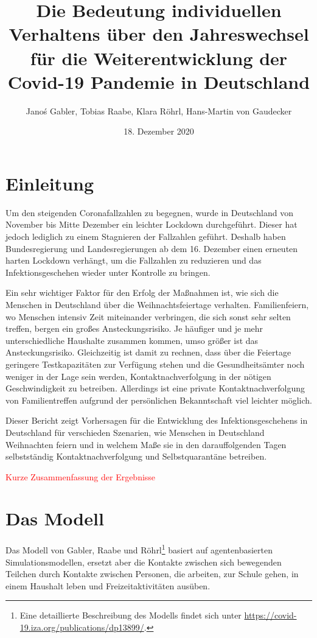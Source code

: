 \documentclass[a4paper,11pt,leqno,fleqn]{article}
\title{Die Bedeutung individuellen Verhaltens über den Jahreswechsel für die Weiterentwicklung der Covid-19 Pandemie in Deutschland}
\date{18. Dezember 2020}
\author{Janoś Gabler, Tobias Raabe, Klara Röhrl, Hans-Martin von Gaudecker}
\begin{document}
\maketitle
{}
\setcounter{page}{1}


\section{Einleitung}

Um den steigenden Coronafallzahlen zu begegnen, wurde in Deutschland von November bis Mitte Dezember ein leichter Lockdown durchgeführt.
Dieser hat jedoch lediglich zu einem Stagnieren der Fallzahlen geführt.
Deshalb haben Bundesregierung und Landesregierungen ab dem 16. Dezember einen erneuten harten Lockdown verhängt, um die Fallzahlen zu reduzieren und das Infektionsgeschehen wieder unter Kontrolle zu bringen.

Ein sehr wichtiger Faktor für den Erfolg der Maßnahmen ist, wie sich die Menschen in Deutschland über die Weihnachtsfeiertage verhalten.
Familienfeiern, wo Menschen intensiv Zeit miteinander verbringen, die sich sonst sehr selten treffen, bergen ein großes Ansteckungsrisiko.
Je häufiger und je mehr unterschiedliche Haushalte zusammen kommen, umso größer ist das Ansteckungsrisiko.
Gleichzeitig ist damit zu rechnen, dass über die Feiertage geringere Testkapazitäten zur Verfügung stehen und die Gesundheitsämter noch weniger in der Lage sein werden, Kontaktnachverfolgung in der nötigen Geschwindigkeit zu betreiben.
Allerdings ist eine private Kontaktnachverfolgung von Familientreffen aufgrund der persönlichen Bekanntschaft viel leichter möglich.

Dieser Bericht zeigt Vorhersagen für die Entwicklung des Infektionsgeschehens in Deutschland für verschieden Szenarien, wie Menschen in Deutschland Weihnachten feiern und in welchem Maße sie in den darauffolgenden Tagen selbstständig Kontaktnachverfolgung und Selbstquarantäne betreiben.

\textcolor{red}{Kurze Zusammenfassung der Ergebnisse}

\section{Das Modell}

Das Modell von Gabler, Raabe und Röhrl\footnote{Eine detaillierte Beschreibung des Modells findet sich unter \url{https://covid-19.iza.org/publications/dp13899/}.} basiert auf agentenbasierten Simulationsmodellen, ersetzt aber die Kontakte zwischen sich bewegenden Teilchen durch Kontakte zwischen Personen, die arbeiten, zur Schule gehen, in einem Haushalt leben und Freizeitaktivitäten ausüben.
\end{document}
